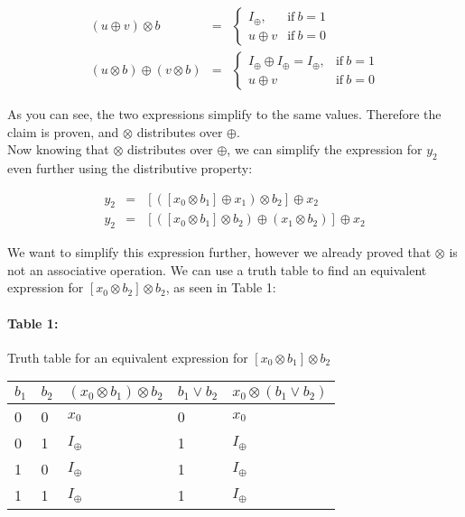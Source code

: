 \documentclass[11pt]{article}
\begin{document}
  \begin{eqnarray*}
    (u \oplus v) \otimes b &=&
    \begin{cases}
      I_\oplus, & \text{if}\ b = 1 \\
      u \oplus v & \text{if}\ b = 0
    \end{cases}
    \\(u \otimes b) \oplus (v \otimes b) &=&
    \begin{cases}
      I_\oplus \oplus I_\oplus = I_\oplus, & \text{if}\ b = 1 \\
      u \oplus v & \text{if}\ b = 0
    \end{cases}
  \end{eqnarray*}

As you can see, the two expressions simplify to the same values. Therefore the claim is proven, and $\otimes$ distributes over $\oplus$.\\

Now knowing that $\otimes$ distributes over $\oplus$, we can simplify the expression for $y_2$ even further using the distributive property:

  \begin{eqnarray*}
    y_2 &=& [([x_0 \otimes b_1] \oplus x_1) \otimes b_2] \oplus x_2\\
    y_2 &=& [([x_0 \otimes b_1] \otimes b_2) \oplus (x_1 \otimes b_2)] \oplus x_2
  \end{eqnarray*}

  We want to simplify this expression further, however we already proved that $\otimes$ is not an associative operation. We can use a truth table to find an equivalent expression for $[x_0 \otimes b_2] \otimes b_2$, as seen in Table 1:

\paragraph{Table 1:} Truth table for an equivalent expression for $[x_0 \otimes b_1] \otimes b_2$

\begin{tabu} to 0.8\textwidth { | X[3] | X[3] | X[3] | X[3] | X[3] |}
 \hline
 $b_1$ & $b_2$ & $(x_0 \otimes b_1) \otimes b_2$ & $b_1 \vee b_2$ & $x_0 \otimes (b_1 \vee b_2)$ \\
  & 0 & $x_0$ & 0 & $x_0$  \\
 & 1 & $I_\oplus$ & 1 & $I_\oplus$  \\
 & 0 & $I_\oplus$ & 1 & $I_\oplus$  \\
 & 1 & $I_\oplus$ & 1 & $I_\oplus$  \\
\hline
\end{tabu}
\end{document}
